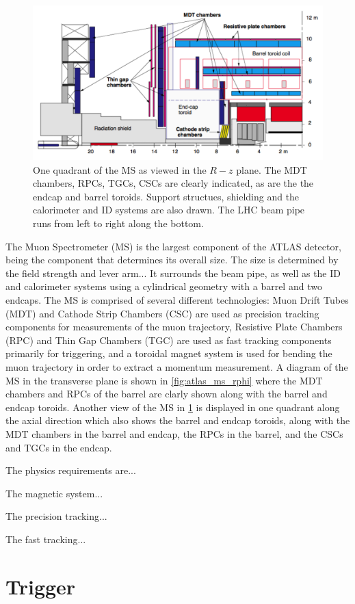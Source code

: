 \begin{figure}[ht]
\centering
\includegraphics[width=.8\textwidth]{figures/atlas/ms_rz}
\caption{One quadrant of the MS as viewed in the $R-z$ plane. The
MDT chambers, RPCs, TGCs, CSCs are clearly indicated, as are the 
the endcap and barrel toroids. Support structues, shielding and the calorimeter
and ID systems are also drawn. The LHC beam pipe runs from left to right
along the bottom.}
\label{fig:atlas_ms_rz}
\end{figure}

The Muon Spectrometer (MS) is the largest component of the ATLAS
detector, being the component that determines its overall size. 
The size is determined by the field strength and lever arm...
It surrounds the beam pipe, as well as the ID and calorimeter systems
using a cylindrical geometry with a barrel and two endcaps. 
The MS is comprised of several different technologies:
Muon Drift Tubes (MDT) and Cathode Strip Chambers (CSC) are used as
precision tracking components for measurements of the muon 
trajectory, Resistive Plate Chambers (RPC) and 
Thin Gap Chambers (TGC) are used as fast 
tracking components primarily for triggering, 
and a toroidal magnet system is used for bending the muon trajectory 
in order to extract a momentum measurement.
A diagram of the MS in the transverse plane is shown in 
\fig\ref{fig:atlas_ms_rphi} where the MDT chambers and RPCs of the barrel
are clarly shown along with the barrel and endcap toroids.
Another view of the MS in \fig\ref{fig:atlas_ms_rz} is displayed in
one quadrant along the axial direction which
also shows the barrel and endcap toroids, along with 
the MDT chambers in the barrel and endcap, the RPCs in the
barrel, and the CSCs and TGCs in the endcap.

The physics requirements are...



The magnetic system...

The precision tracking...

The fast tracking...





\section{Trigger}

